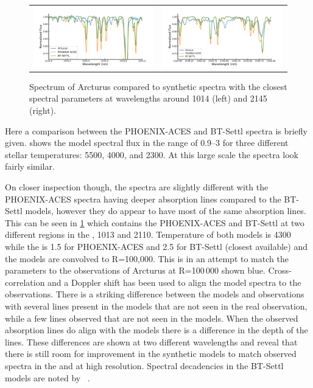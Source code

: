 \begin{figure}
    \centering
    \begin{tabular}{cc}
        \includegraphics[width=0.48\linewidth]{figures/atmos_and_models/artucus_1micron} & \includegraphics[width=0.48\linewidth]{figures/atmos_and_models/artucus_2micron}\\
    \end{tabular}
    \caption[Comparision of the spectrum of Arcturus to synthetic specta.]{Spectrum of Arcturus compared to synthetic spectra with the closest spectral parameters at wavelengths around 1014\nm{} (left) and 2145\nm{} (right).}
    \label{fig:artucus1-2micron}
\end{figure}

Here a comparison between the {PHOENIX-ACES} and {BT-Settl} spectra is briefly given.
 shows the model spectral flux in the \nir{} range of 0.9--3\um{} for three different stellar temperatures: 5500, 4000, and 2300\K{}.
At this large scale the spectra look fairly similar.

On closer inspection though, the spectra are slightly different with the {PHOENIX-ACES} spectra having deeper absorption lines compared to the {BT-Settl} models, however they do appear to have most of the same absorption lines.
This can be seen in \cref{fig:artucus1-2micron} which contains the {PHOENIX-ACES} and {BT-Settl} at two different regions in the \nir, 1013\nm{} and 2110\nm{}.
Temperature of both models is 4300\K{} while the \logg{} is 1.5 for {PHOENIX-ACES} and 2.5 for {BT-Settl} (closest available) and the models are convolved to R=100,000.
This is in an attempt to match the parameters to the observations of {Arcturus} at R=100\,000 shown blue.
Cross-correlation and a Doppler shift has been used to align the model spectra to the observations.
There is a striking difference between the models and observations with several lines present in the models that are not seen in the real observation, while a few lines observed that are not seen in the models.
When the observed absorption lines do align with the models there is a difference in the depth of the lines.
These differences are shown at two different wavelengths and reveal that there is still room for improvement in the synthetic models to match observed spectra in the \nir{} and at high resolution.
Spectral decadencies in the {BT-Settl} models are noted by ~\citet{rajpurohit_effective_2013}.


